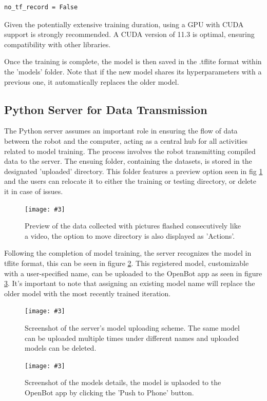 \documentclass[12pt]{report}
\newcommand\insertfigure[5]{
\begin{figure}[#1]
\begin{center}
\texttt{[image: \#3]}
\end{center}
\caption{#4}
\label{#5}
\end{figure}
}
\begin{document}
\begin{lstlisting}
no_tf_record = False 
\end{lstlisting}

Given the potentially extensive training duration, using a GPU with CUDA support is strongly recommended. A CUDA version of 11.3 is optimal, ensuring compatibility with other libraries.

Once the training is complete, the model is then saved in the .tflite format within the 'models' folder. Note that if the new model shares its hyperparameters with a previous one, it automatically replaces the older model.

\newpage
\subsection{Python Server for Data Transmission}
\label{sub:server}
The Python server assumes an important role in ensuring the flow of data between the robot and the computer, acting as a central hub for all activities related to model training. The process involves the robot transmitting compiled data to the server. The ensuing folder, containing the datasets, is stored in the designated 'uploaded' directory. This folder features a preview option seen in fig \ref{fig:preview} and the users can relocate it to either the training or testing directory, or delete it in case of issues.

\insertfigure{th}{0.5\textwidth}{preview.png}{Preview of the data collected with pictures flashed consecutively like a video, the option to move directory is also displayed as 'Actions'.}{fig:preview}


Following the completion of model training, the server recognizes the model in tflite format, this can be seen in figure \ref{fig:model}. This registered model, customizable with a user-specified name, can be uploaded to the OpenBot app as seen in figure \ref{fig:uploading}. It's important to note that assigning an existing model name will replace the older model with the most recently trained iteration.

\insertfigure{th}{0.4\textwidth}{model.png}{Screenshot of the server's model uploading scheme. The same model can be uploaded multiple times under different names and uploaded models can be deleted.}{fig:model}

\insertfigure{th}{0.4\textwidth}{uploading.png}{Screenshot of the models details, the model is uplaoded to the OpenBot app by clicking the 'Push to Phone' button.}{fig:uploading}
\end{document}
